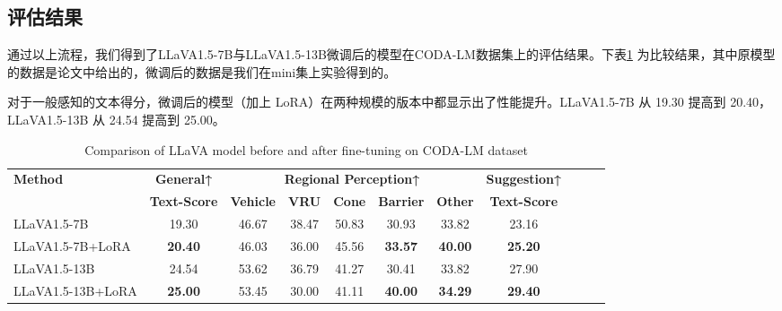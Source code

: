\documentclass[
    linespread = 1.25
]{ctexart}
\begin{document}
\subsection{评估结果}
通过以上流程，我们得到了LLaVA1.5-7B与LLaVA1.5-13B微调后的模型在CODA-LM数据集上的评估结果。下表\ref{CODA-LM result}
为比较结果，其中原模型的数据是论文\cite{chen2024automatedevaluationlargevisionlanguage}中给出的，微调后的数据是我们在mini集上实验得到的。

对于一般感知的文本得分，微调后的模型（加上 LoRA）在两种规模的版本中都显示出了性能提升。LLaVA1.5-7B 从 19.30 提高到 20.40，LLaVA1.5-13B 从 24.54 提高到 25.00。
\begin{table}[htbp]
  \centering
  \caption{Comparison of LLaVA model before and after fine-tuning on CODA-LM dataset}
  \label{CODA-LM result}
  \small %
  \begin{tabular}{lcccccccccc}
    \toprule
    \textbf{Method}   & \textbf{General↑}   & \multicolumn{5}{c}{\textbf{Regional Perception↑}} & \textbf{Suggestion↑}                                                                           \\
    \cmidrule(r){3-7}
                      & \textbf{Text-Score} & \textbf{Vehicle}                                  & \textbf{VRU}         & \textbf{Cone} & \textbf{Barrier} & \textbf{Other} & \textbf{Text-Score} \\
    \midrule
    LLaVA1.5-7B       & 19.30               & 46.67                                             & 38.47                & 50.83         & 30.93            & 33.82          & 23.16               \\
    LLaVA1.5-7B+LoRA  & \textbf{20.40}      & 46.03                                             & 36.00                & 45.56         & \textbf{33.57}   & \textbf{40.00} & \textbf{25.20}      \\
    \midrule
    LLaVA1.5-13B      & 24.54               & 53.62                                             & 36.79                & 41.27         & 30.41            & 33.82          & 27.90               \\
    LLaVA1.5-13B+LoRA & \textbf{25.00}      & 53.45                                             & 30.00                & 41.11         & \textbf{40.00}   & \textbf{34.29} & \textbf{29.40}      \\
    \bottomrule
  \end{tabular}
\end{table}
\end{document}
